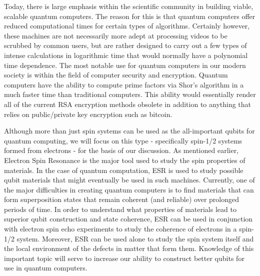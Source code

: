 \documentclass[oneside, astronomy, noacknowlegments]{BYUPhys}
\begin{document}
Today, there is large emphasis within the scientific community in building viable, scalable quantum computers. The reason for this is that quantum computers offer reduced computational times for certain types of algorithms. Certainly however, these machines are not necessarily more adept at processing videos to be scrubbed by common users, but are rather designed to carry out a few types of intense calculations in logarithmic time that would normally have a polynomial time dependence. The most notable use for quantum computers in our modern society is within the field of computer security and encryption. Quantum computers have the ability to compute prime factors via Shor’s algorithm in a much faster time than traditional computers. This ability would essentially render all of the current RSA encryption methods obsolete in addition to anything that relies on public/private key encryption such as bitcoin.

Although more than just spin systems can be used as the all-important qubits for quantum computing, we will focus on this type - specifically spin-1/2 systems formed from electrons - for the basis of our discussion. As mentioned earlier, Electron Spin Resonance is the major tool used to study the spin properties of materials. In the case of quantum computation, ESR is used to study possible qubit materials that might eventually be used in such machines. Currently, one of the major difficulties in creating quantum computers is to find materials that can form superposition states that remain coherent (and reliable) over prolonged periods of time. In order to understand what properties of materials lead to superior qubit construction and state coherence, ESR can be used in conjunction with electron spin echo experiments to study the coherence of electrons in a spin-1/2 system. Moreover, ESR can be used alone to study the spin system itself and the local environment of the defects in matter that form them. Knowledge of this important topic will serve to increase our ability to construct better qubits for use in quantum computers.

\section{}
\section{}
\end{document}
